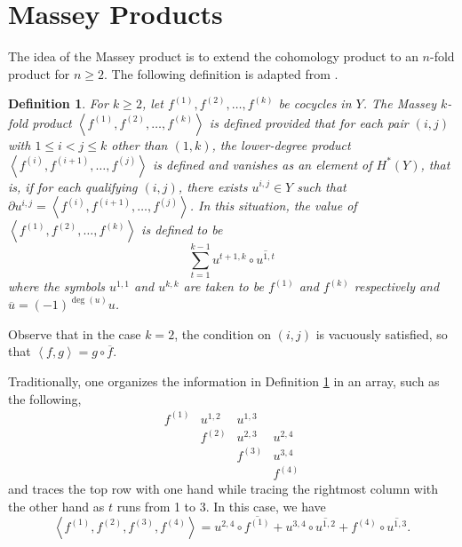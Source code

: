 \documentclass[12pt]{article}
\newtheorem{definition}{Definition}
\begin{document}
\section{Massey Products}\label{mp}
The idea of the Massey product is to extend the cohomology
product to an $n$-fold product for $n\ge 2$.
The following definition is adapted from \cite{kraines}.

\begin{definition}\label{massey}
For $k\ge 2$, let 
$f^{\left(1\right)},
f^{\left(2\right)},\dots,f^{\left(k\right)}$ be cocycles in $Y$.
The {\em Massey $k$-fold product} 
$\left\langle f^{\left(1\right)},
f^{\left(2\right)},\dots,f^{\left(k\right)}\right\rangle$
is defined provided that for each pair $\left(i,j\right)$
with $1\le i<j\le k$ other than $\left(1,k\right)$,
the lower-degree product 
$\left\langle f^{\left(i\right)},
f^{\left(i+1\right)},\dots,f^{\left(j\right)}\right\rangle$
is defined and vanishes as an element of $H^\ast\left(Y\right)$,
that is, if for each qualifying $\left(i,j\right)$,
there exists $u^{i,j}\in Y$ such that 
$\partial u^{i,j}
=\left\langle f^{\left(i\right)},
f^{\left(i+1\right)},\dots,f^{\left(j\right)}\right\rangle$.
In this situation, the value of
$\left\langle f^{\left(1\right)},
f^{\left(2\right)},\dots,f^{\left(k\right)}\right\rangle$
is defined to be
\[\sum_{t=1}^{k-1}
u^{t+1,k}\circ
\overline{u^{1,t}}
\]
where the symbols $u^{1,1}$ and $u^{k,k}$ are taken
to be $f^{\left(1\right)}$ and 
$f^{\left(k\right)}$ respectively
and $\overline{u}=\left(-1\right)^{\deg\left(u\right)}u$.
\end{definition}

Observe that in the case $k=2$, the condition
on $\left(i,j\right)$ is vacuously satisfied,
so that $\left\langle f,g\right\rangle=g\circ\overline{f}$.

Traditionally, one organizes the information
in Definition \ref{massey} 
in an array, such as the following, 
\[\begin{array}{cccc}
f^{\left(1\right)}&u^{1,2}&u^{1,3}\\
&f^{\left(2\right)}&u^{2,3}&u^{2,4}\\
&&f^{\left(3\right)}&u^{3,4}\\
&&&f^{\left(4\right)}\end{array}\]
and traces the top row with one hand
while tracing the rightmost column with
the other hand as $t$ runs from 1 to 3. 
In this case, we have
\[\left\langle f^{\left(1\right)},f^{\left(2\right)},
f^{\left(3\right)},f^{\left(4\right)}\right\rangle
=u^{2,4}\circ \overline{f^{\left(1\right)}}
+ u^{3,4}\circ \overline{u^{1,2}} 
+ f^{\left(4\right)}\circ \overline{u^{1,3}}.\]
\end{document}
